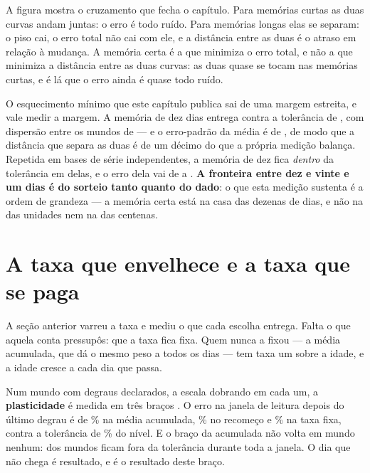 A figura mostra o cruzamento que fecha o capítulo. Para memórias curtas as duas curvas andam juntas:
o erro é todo ruído. Para memórias longas elas se separam: o piso cai, o erro total não cai com ele,
e a distância entre as duas é o atraso em relação à mudança. A memória certa é a que minimiza o erro
total, e não a que minimiza a distância entre as duas curvas: as duas quase se tocam nas memórias
curtas, e é lá que o erro ainda é quase todo ruído.

O esquecimento mínimo que este capítulo publica sai de uma margem estreita, e vale medir a margem.
A memória de dez dias entrega \numEsquecimentoDezErro{} contra a tolerância de
\numEsquecimentoTolerancia{}, com dispersão entre os mundos de \numEsquecimentoDezDispersao{} --- e o
erro-padrão da média é de \numEsquecimentoDezErroPadrao{}, de modo que a distância que separa as duas
é de um décimo do que a própria medição balança. Repetida em \numEsquecimentoBases{} bases de série
independentes, a memória de dez fica \emph{dentro} da tolerância em \numEsquecimentoBasesDentro{}
delas, e o erro dela vai de \numEsquecimentoBaseDezMenor{} a \numEsquecimentoBaseDezMaior.
\textbf{A fronteira entre dez e vinte e um dias é do sorteio tanto quanto do dado}: o que esta medição
sustenta é a ordem de grandeza --- a memória certa está na casa das dezenas de dias, e não na das
unidades nem na das centenas.

\section{A taxa que envelhece e a taxa que se paga}

A seção anterior varreu a taxa e mediu o que cada escolha entrega. Falta o que aquela conta
pressupôs: que a taxa fica fixa. Quem nunca a fixou --- a média acumulada, que dá o mesmo peso a
todos os dias --- tem taxa um sobre a idade, e a idade cresce a cada dia que passa.

Num mundo com \numPlastDegraus{} degraus declarados, a escala dobrando em cada um, a
\textbf{plasticidade} é medida em três braços \cite{farias2025self}. O erro na janela de leitura depois do último degrau
é de \numPlastErroAcumuladaPct\% na média acumulada, \numPlastErroRecomecoPct\% no recomeço e
\numPlastErroExponencialPct\% na taxa fixa, contra a tolerância de \numPlastToleranciaPct\% do
nível. E o braço da acumulada não volta em mundo nenhum: \numPlastSemVoltaAcumulada{} dos
\numPlastMundos{} mundos ficam fora da tolerância durante toda a janela. O dia que não chega é
resultado, e é o resultado deste braço.

